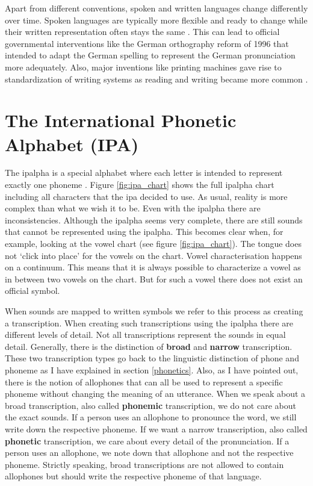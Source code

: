 Apart from different conventions, spoken and written languages change differently over time. Spoken languages are typically more flexible and ready to change while their written representation often stays the same \citep{unicode-lingu}. This can lead to official governmental interventions like the German orthography reform of 1996 that intended to adapt the German spelling to represent the German pronunciation more adequately. Also, major inventions like printing machines gave rise to standardization of writing systems as reading and writing became more common \citep{writing-systems}.

\section{The International Phonetic Alphabet (IPA)}
\label{sec:ipa}
The \ac{ipalpha} is a special alphabet where each letter is intended to represent exactly one phoneme  \citep{writing-systems, Intro.2007}. Figure \ref{fig:ipa_chart} shows the full \ac{ipalpha} chart including all characters that the \ac{ipa} decided to use. As usual, reality is more complex than what we wish it to be. Even with the \ac{ipalpha} there are inconsistencies. Although the \ac{ipalpha} seems very complete, there are still sounds that cannot be represented using the \ac{ipalpha}. This becomes clear when, for example, looking at the vowel chart (see figure \ref{fig:ipa_chart}). The tongue does not `click into place' for the vowels on the chart. Vowel characterisation happens on a continuum. This means that it is always possible to characterize a vowel as in between two vowels on the chart. But for such a vowel there does not exist an official symbol.

When sounds are mapped to written symbols we refer to this process as creating a transcription. When creating such transcriptions using the \ac{ipalpha} there are different levels of detail. Not all transcriptions represent the sounds in equal detail. Generally, there is the distinction of \textbf{broad} and \textbf{narrow} transcription. These two transcription types go back to the linguistic distinction of phone and phoneme as I have explained in section \ref{phonetics}. Also, as I have pointed out, there is the notion of allophones that can all be used to represent a specific phoneme without changing the meaning of an utterance. When we speak about a broad transcription, also called \textbf{phonemic} transcription, we do not care about the exact sounds. If a person uses an allophone to pronounce the word, we still write down the respective phoneme. If we want a narrow transcription, also called \textbf{phonetic} transcription, we care about every detail of the pronunciation. If a person uses an allophone, we note down that allophone and not the respective phoneme. Strictly speaking, broad transcriptions are not allowed to contain allophones but should write the respective phoneme of that language. 

